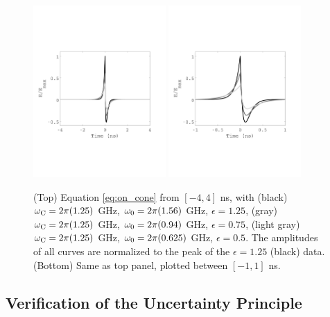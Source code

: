 \documentclass[amsmath,amssymb,aps,prd,10pt,twocolumn]{revtex4}
\begin{document}
\begin{figure}
\centering
\includegraphics[width=0.45\textwidth,trim=0cm 6cm 0cm 7cm,clip=true]{Sept24_plot1.pdf}
\includegraphics[width=0.45\textwidth,trim=0cm 6cm 0cm 7cm,clip=true]{Sept24_plot2.pdf}
\caption{\label{fig:on_cone} (Top) Equation \ref{eq:on_cone} from $[-4,4]$ ns, with (black) $\omega_{\rm C} = 2\pi(1.25)$ GHz, $\omega_{\rm 0} = 2\pi(1.56)$ GHz, $\epsilon = 1.25$, (gray) $\omega_{\rm C} = 2\pi(1.25)$ GHz, $\omega_{\rm 0} = 2\pi(0.94)$ GHz, $\epsilon = 0.75$, (light gray) $\omega_{\rm C} = 2\pi(1.25)$ GHz, $\omega_{\rm 0} = 2\pi(0.625)$ GHz, $\epsilon = 0.5$.  The amplitudes of all curves are normalized to the peak of the $\epsilon = 1.25$ (black) data. (Bottom) Same as top panel, plotted between $[-1,1]$ ns.}
\end{figure}

\subsection{Verification of the Uncertainty Principle}
\label{sec:sigma0}
\end{document}

